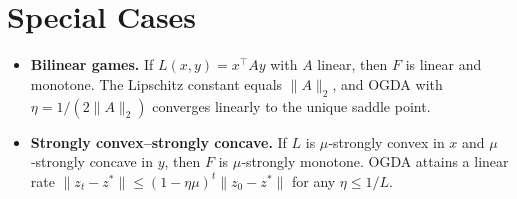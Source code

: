 \documentclass{article}
\begin{document}
\section*{Special Cases}
\begin{itemize}
\item \textbf{Bilinear games.} If $L(x,y)=x^\top Ay$ with $A$ linear, then $F$ is linear and monotone. The Lipschitz constant equals $\|A\|_2$, and OGDA with $\eta=1/(2\|A\|_2)$ converges linearly to the unique saddle point.
\item \textbf{Strongly convex–strongly concave.} If $L$ is $\mu$‑strongly convex in $x$ and $\mu$‑strongly concave in $y$, then $F$ is $\mu$‑strongly monotone. OGDA attains a linear rate $\|z_t-z^*\|\le (1-\eta\mu)^{t}\|z_0-z^*\|$ for any $\eta\le 1/L$.
\end{itemize}
\end{document}
